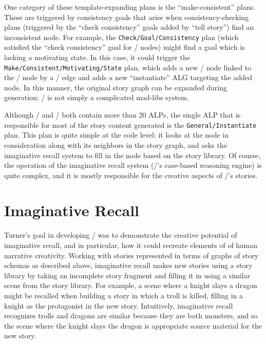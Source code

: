 One category of these template-expanding plans is the ``make-consistent'' plans.
%
These are triggered by consistency goals that arise when consistency-checking plans (triggered by the ``check consistency'' goals added by ``tell story'') find an inconsistent node.
%
For example, the \texttt{Check\abr/Goal\abr/Consistency} plan (which satisfied the ``check consistency'' goal for \gng/ nodes) might find a goal which is lacking a motivating state.
%
In this case, it could trigger the \texttt{Make\abr/Consistent\abr/Motivating\abr/State} plan, which adds a new \gns/ node linked to the \gng/ node by a \gem/ edge and adds a new ``instantiate'' ALG targeting the added node.
%
In this manner, the original story graph can be expanded during generation; \minstrel/ is not simply a complicated mad-libs system.


Although \minstrel/ and \skald/ both contain more than 20 ALPs, the single ALP that is responsible for most of the story content generated is the \texttt{General\abr/Instantiate} plan.
%
This plan is quite simple at the code level: it looks at the node in consideration along with its neighbors in the story graph, and asks the imaginative recall system to fill in the node based on the story library.
%
Of course, the operation of the imaginative recall system (\minstrel/'s case-based reasoning engine) is quite complex, and it is mostly responsible for the creative aspects of \minstrel/'s stories.


\section{Imaginative Recall}

Turner's goal in developing \minstrel/ was to demonstrate the creative potential of imaginative recall, and in particular, how it could recreate elements of of human narrative creativity.
%
Working with stories represented in terms of graphs of story schemas as described above, imaginative recall makes new stories using a story library by taking an incomplete story fragment and filling it in using a similar scene from the story library.
%
For example, a scene where a knight slays a dragon might be recalled when building a story in which a troll is killed, filling in a knight as the protagonist in the new story.
%
Intuitively, imaginative recall recognizes trolls and dragons are similar because they are both monsters, and so the scene where the knight slays the dragon is appropriate source material for the new story.


